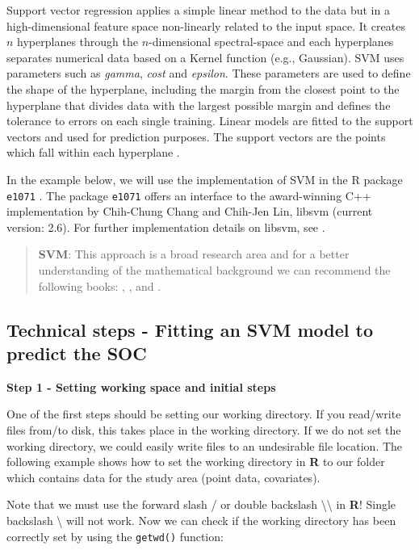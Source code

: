 \documentclass[10pt,b5paper,]{book}
\theoremstyle{definition}
\theoremstyle{definition}
\theoremstyle{definition}
\theoremstyle{remark}
\begin{document}
Support vector regression applies a simple linear method to the data but
in a high-dimensional feature space non-linearly related to the input
space. It creates \(n\) hyperplanes through the \(n\)-dimensional
spectral-space and each hyperplanes separates numerical data based on a
Kernel function (e.g., Gaussian). SVM uses parameters such as
\emph{gamma}, \emph{cost} and \emph{epsilon}. These parameters are used
to define the shape of the hyperplane, including the margin from the
closest point to the hyperplane that divides data with the largest
possible margin and defines the tolerance to errors on each single
training. Linear models are fitted to the support vectors and used for
prediction purposes. The support vectors are the points which fall
within each hyperplane \citep{guevara_2018}.

In the example below, we will use the implementation of SVM in the R
package \texttt{e1071} \citep{e1071}. The package \texttt{e1071} offers
an interface to the award-winning C++ implementation by Chih-Chung Chang
and Chih-Jen Lin, libsvm (current version: 2.6). For further
implementation details on libsvm, see \citet{chang2001libsvm}.

\begin{quote}
\textbf{SVM}: This approach is a broad research area and for a better
understanding of the mathematical background we can recommend the
following books: \citet{vapnik2013nature}, \citet{friedman2001elements},
and \citet{james2013introduction}.
\end{quote}

\hypertarget{technical-steps---fitting-an-svm-model-to-predict-the-soc}{%
\subsection{Technical steps - Fitting an SVM model to predict the
SOC}\label{technical-steps---fitting-an-svm-model-to-predict-the-soc}}

\textbf{Step 1 - Setting working space and initial steps}

One of the first steps should be setting our working directory. If you
read/write files from/to disk, this takes place in the working
directory. If we do not set the working directory, we could easily write
files to an undesirable file location. The following example shows how
to set the working directory in \textbf{R} to our folder which contains
data for the study area (point data, covariates).

Note that we must use the forward slash / or double backslash
\textbackslash{}\textbackslash{} in \textbf{R}! Single backslash
\textbackslash{} will not work. Now we can check if the working
directory has been correctly set by using the \texttt{getwd()} function:
\end{document}
